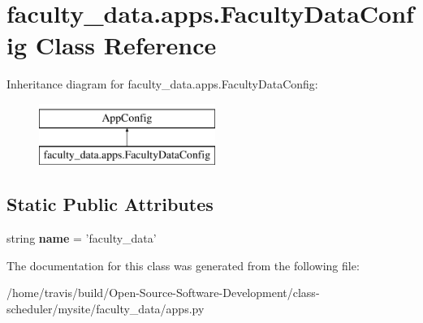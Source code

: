 \hypertarget{classfaculty__data_1_1apps_1_1_faculty_data_config}{\section{faculty\-\_\-data.\-apps.\-Faculty\-Data\-Config Class Reference}
\label{classfaculty__data_1_1apps_1_1_faculty_data_config}
}
Inheritance diagram for faculty\-\_\-data.\-apps.\-Faculty\-Data\-Config\-:\begin{figure}[H]
\begin{center}
\leavevmode
\includegraphics[height=2.000000cm]{classfaculty__data_1_1apps_1_1_faculty_data_config}
\end{center}
\end{figure}
\subsection*{Static Public Attributes}
\begin{DoxyCompactItemize}
\item 
\hypertarget{classfaculty__data_1_1apps_1_1_faculty_data_config_a430bbb7f477ea75ba557a828da2d48ac}{string {\bfseries name} = 'faculty\-\_\-data'}\label{classfaculty__data_1_1apps_1_1_faculty_data_config_a430bbb7f477ea75ba557a828da2d48ac}

\end{DoxyCompactItemize}


The documentation for this class was generated from the following file\-:\begin{DoxyCompactItemize}
\item 
/home/travis/build/\-Open-\/\-Source-\/\-Software-\/\-Development/class-\/scheduler/mysite/faculty\-\_\-data/apps.\-py\end{DoxyCompactItemize}
